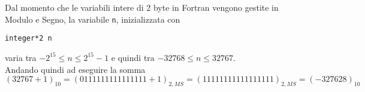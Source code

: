 Dal momento che le variabili intere di 2 byte in Fortran vengono gestite in Modulo e Segno, la variabile \texttt{n}, inizializzata con

\begin{lstlisting}
integer*2 n
\end{lstlisting}

varia tra \( - 2^{15} \leq n \leq 2^{15} - 1 \) e quindi tra  \( -32768 \leq n \leq 32767 \). \\
Andando quindi ad eseguire la somma \( (32767+1)_{10} = (0111111111111111 + 1)_{2,MS} = (11111111111111111)_{2,MS} = (-327628)_{10} \)
